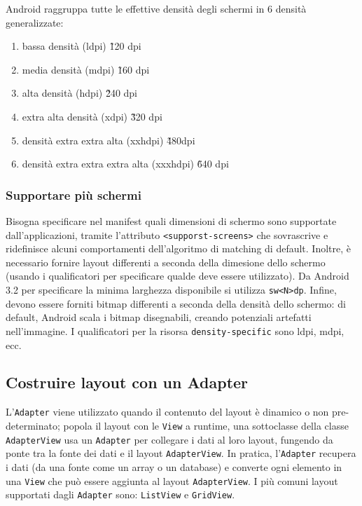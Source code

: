Android raggruppa tutte le effettive densità degli schermi in 6 densità generalizzate:

\begin{enumerate}
\item bassa densità (ldpi) \~ 120 dpi
\item media densità (mdpi) \~ 160 dpi
\item alta densità (hdpi) \~ 240 dpi
\item extra alta densità (xdpi) \~ 320 dpi
\item densità extra extra alta (xxhdpi) \~ 480dpi
\item densità extra extra extra alta (xxxhdpi) \~ 640 dpi
\end{enumerate}

\subsubsection{Supportare più schermi}

Bisogna specificare nel manifest quali dimensioni di schermo sono supportate dall'applicazioni, tramite l'attributo \texttt{<supporst-screens>} che sovrascrive e ridefinisce alcuni comportamenti dell'algoritmo di matching di default.
Inoltre, è necessario fornire layout differenti a seconda della dimesione dello schermo (usando i qualificatori per specificare qualde deve essere utilizzato). Da Android 3.2 per specificare la minima larghezza disponibile si utilizza \texttt{sw<N>dp}.
Infine, devono essere forniti bitmap differenti a seconda della densità dello schermo: di default, Android scala i bitmap disegnabili, creando potenziali artefatti nell'immagine. I qualificatori per la risorsa \texttt{density-specific} sono ldpi, mdpi, ecc.

\subsection{Costruire layout con un Adapter}

L'\texttt{Adapter} viene utilizzato quando il contenuto del layout è dinamico o non pre-determinato; popola il layout con le \texttt{View} a runtime, una sottoclasse della classe \texttt{AdapterView} usa un \texttt{Adapter} per collegare i dati al loro layout, fungendo da ponte tra la fonte dei dati e il layout \texttt{AdapterView}. In pratica, l'\texttt{Adapter} recupera i dati (da una fonte come un array o un database) e converte ogni elemento in una \texttt{View} che può essere aggiunta al layout \texttt{AdapterView}.
I più comuni layout supportati dagli \texttt{Adapter} sono: \texttt{ListView} e \texttt{GridView}.

